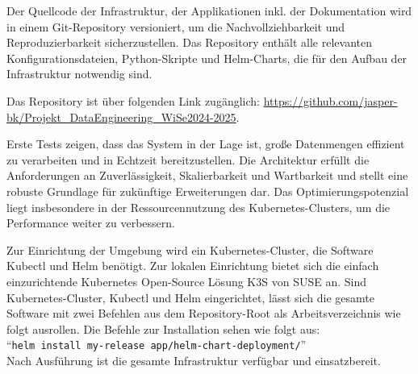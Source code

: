 \documentclass[%
pdftex,
oneside,			%
11pt,				%
parskip=half,		%
headheight = 12pt,	%
headsepline,		%
footsepline,		%
footheight = 16pt,	%
abstracton,		%
DIV=calc,		%
BCOR=8mm,		%
headinclude=false,	%
footinclude=false,	%
listof=totoc,		%
toc=bibliography,	%
]{scrreprt}	%
\begin{document}
    Der Quellcode der Infrastruktur, der Applikationen inkl. der Dokumentation wird in einem Git-Repository versioniert, um die Nachvollziehbarkeit und Reproduzierbarkeit sicherzustellen.
    Das Repository enthält alle relevanten Konfigurationsdateien, Python-Skripte und Helm-Charts, die für den Aufbau der Infrastruktur notwendig sind.

    Das Repository ist über folgenden Link zugänglich:
    \url{https://github.com/jasper-bk/Projekt_DataEngineering_WiSe2024-2025}. %

    Erste Tests zeigen, dass das System in der Lage ist, große Datenmengen effizient zu verarbeiten und in Echtzeit bereitzustellen.
    Die Architektur erfüllt die Anforderungen an Zuverlässigkeit, Skalierbarkeit und Wartbarkeit und stellt eine robuste Grundlage für zukünftige Erweiterungen dar.
    Das Optimierungspotenzial liegt insbesondere in der Ressourcennutzung des Kubernetes-Clusters, um die Performance weiter zu verbessern.

    Zur Einrichtung der Umgebung wird ein Kubernetes-Cluster, die Software Kubectl und Helm benötigt.
    Zur lokalen Einrichtung bietet sich die einfach einzurichtende Kubernetes Open-Source Lösung K3S von SUSE an.
    Sind Kubernetes-Cluster, Kubectl und Helm eingerichtet, lässt sich die gesamte Software mit zwei Befehlen aus dem Repository-Root als Arbeitsverzeichnis wie folgt ausrollen.
    Die Befehle zur Installation sehen wie folgt aus:\\
    \enquote{\lstinline[columns=fixed]{helm install my-release app/helm-chart-deployment/}}\\ %
    Nach Ausführung ist die gesamte Infrastruktur verfügbar und einsatzbereit.



\ifx\VAlterZitierstil\VTrueValue
    \printbibliography
\else
    
    
\fi
\end{document}
